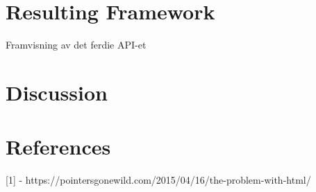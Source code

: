 \documentclass[12pt]{article}
\begin{document}
\section{Resulting Framework}
Framvisning av det ferdie API-et

\section{Discussion}

\section{References}
[1] - https://pointersgonewild.com/2015/04/16/the-problem-with-html/
\end{document}
